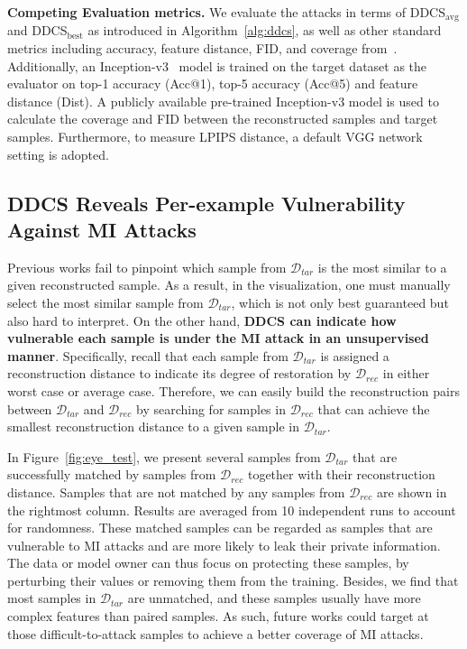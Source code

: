\noindent
\textbf{Competing Evaluation metrics.}\quad
We evaluate the attacks in terms of DDCS$_{\text{avg}}$ and DDCS$_{\text{best}}$ as introduced in Algorithm~\ref{alg:ddcs}, as well as other standard metrics including accuracy, feature distance, FID, and coverage from~\cite{densitycoverage,vmi21nips}.
Additionally, an Inception-v3~\cite{inceptionv3} model is trained on the target dataset as the evaluator on top-1 accuracy (Acc@1), top-5 accuracy (Acc@5) and feature distance (Dist).
A publicly available pre-trained Inception-v3 model is used to calculate the coverage and FID between the reconstructed samples and target samples.
Furthermore, to measure LPIPS distance, a default VGG network setting is adopted.

\subsection{DDCS Reveals Per-example Vulnerability Against MI Attacks}
\label{sec:exp:per_examples}



Previous works fail to pinpoint which sample from $\mathcal{D}_{tar}$ is the most similar to a given reconstructed sample.
As a result, in the visualization, one must manually select the most similar sample from $\mathcal{D}_{tar}$, which is not only best guaranteed but also hard to interpret.
On the other hand, \textbf{DDCS can indicate how vulnerable each sample is under the MI attack in an unsupervised manner}.
Specifically, recall that each sample from $\mathcal{D}_{tar}$ is assigned a reconstruction distance to indicate its degree of restoration by $\mathcal{D}_{rec}$ in either worst case or average case.
Therefore, we can easily build the reconstruction pairs between $\mathcal{D}_{tar}$ and $\mathcal{D}_{rec}$ by searching for samples in $\mathcal{D}_{rec}$ that can achieve the smallest reconstruction distance to a given sample in $\mathcal{D}_{tar}$.

In Figure~\ref{fig:eye_test}, we present several samples from $\mathcal{D}_{tar}$ that are successfully matched by samples from $\mathcal{D}_{rec}$ together with their reconstruction distance. Samples that are not matched by any samples from $\mathcal{D}_{rec}$ are shown in the rightmost column.
Results are averaged from 10 independent runs to account for randomness.
These matched samples can be regarded as samples that are vulnerable to MI attacks and are more likely to leak their private information.
The data or model owner can thus focus on protecting these samples, by perturbing their values or removing them from the training.
Besides, we find that most samples in $\mathcal{D}_{tar}$ are unmatched, and these samples usually have more complex features than paired samples.
As such, future works could target at those difficult-to-attack samples to achieve a better coverage of MI attacks.

